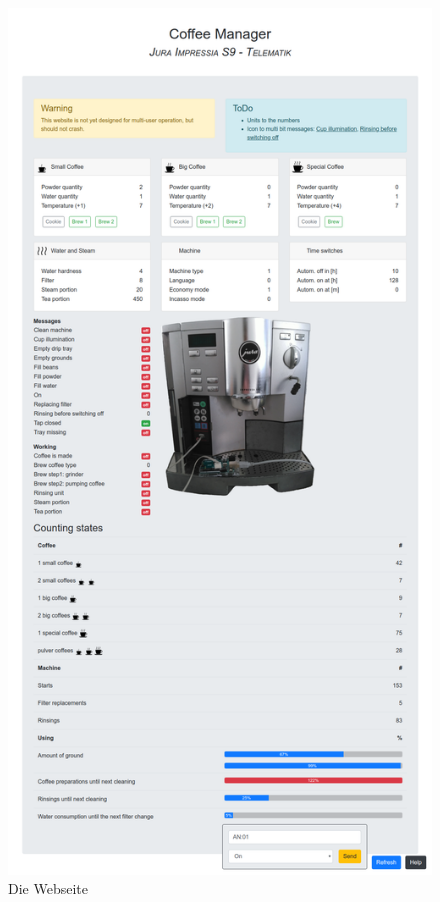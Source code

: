 \begin{figure}
  \begin{center}
    \includegraphics[scale=0.25]{images/chapter_4/Webseite}
    \caption{Die Webseite}
    \label{fig:website}
  \end{center}
\end{figure}

